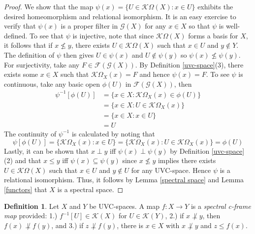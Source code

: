 \documentclass{amsart}
\theoremstyle{plain}
\theoremstyle{definition}
\newtheorem{definition}[theorem]{Definition}
\begin{document}
\begin{proof}
    We show that the map $\psi(x)=\{U\in\mathcal{K}\Omega(X):x\in U\}$ exhibits the desired homeomorphism and relational isomorphism. It is an easy exercise to verify that $\psi(x)$ is a proper filter in $\mathcal{G}(X)$ for any $x\in X$ so that $\psi$ is well-defined. To see that $\psi$ is injective, note that since $\mathcal{K}\Omega(X)$ forms a basis for $X$, it follows that if $x\not\leqslant y$, there exists $U\in\mathcal{K}\Omega(X)$ such that $x\in U$ and $y\not\in Y$. The definition of $\psi$ then gives $U\in\psi(x)$ and $U\not\in\psi(y)$ so $\psi(x)\not\leqslant\psi(y)$. For surjectivity, take any $F\in\mathcal{F}(\mathcal{G}(X))$. By Definition \ref{uvc-space}(3), there exists some $x\in X$ such that $\mathcal{K}\Omega_X(x)=F$ and hence $\psi(x)=F$. To see $\psi$ is continuous, take any basic open $\phi(U)$ in $\mathcal{F}(\mathcal{G}(X))$, then 
    \begin{align*}
        \psi^{-1}[\phi(U)]&=\{x\in X:\mathcal{K}\Omega_X(x)\in\phi(U)\}\\&=\{x\in X:U\in\mathcal{K}\Omega_X(x)\}\\&=\{x\in X:x\in U\}\\&=U
    \end{align*}
   The continuity of $\psi^{-1}$ is calculated by noting that 
 \[
       \psi[\phi(U)]=\{\mathcal{K}\Omega_X(x):x\in U\}=\{\mathcal{K}\Omega_X(x):U\in\mathcal{K}\Omega_X(x)\}=\phi(U)
\]
 Lastly, it can be shown that $x\perp y$ iff $\psi(x)\perp\psi(y)$ by Definition \ref{uvc-space}(2) and that $x\leqslant y$ iff $\psi(x)\subseteq\psi(y)$ since $x\not\leqslant y$ implies there exists $U\in\mathcal{K}\Omega(X)$ such that $x\in U$ and $y\not\in U$ for any UVC-space. Hence $\psi$ is a relational isomorphism. Thus, it follows by Lemma \ref{spectral space} and Lemma \ref{functors} that $X$ is a spectral space.     
\end{proof}
 
\begin{definition}\label{uvc-map}
    Let $X$ and $Y$ be UVC-spaces. A map $f\colon X\to Y$ is a \emph{spectral c-frame map} provided: 1.) $f^{-1}[U]\in\mathcal{K}(X)$ for $U\in\mathcal{K}(Y)$, 2.) if $x\not\perp y$, then $f(x)\not\perp f(y)$, and 3.) if $z\not\perp f (y)$, there is $x\in X$ with $x\not\perp y$ and $z\leqslant f(x)$.
    
    
\end{definition}
\end{document}
